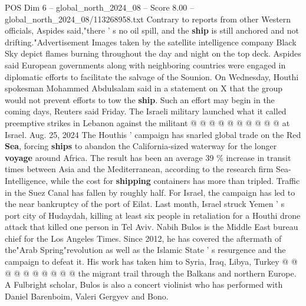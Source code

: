\begin{textsample}{POS Dim 6 – global\_north\_2024\_08 – Score 8.00 – global\_north\_2024\_08/113268958.txt}
Contrary to reports from other Western officials, Aspides said,"there ' s no oil spill, and the \textbf{ship} is still anchored and not drifting."Advertisement Images taken by the satellite intelligence company Black Sky depict flames burning throughout the day and night on the top deck.
Aspides said European governments along with neighboring countries were engaged in diplomatic efforts to facilitate the salvage of the Sounion.
On Wednesday, Houthi spokesman Mohammed Abdulsalam said in a statement on X that the group would not prevent efforts to tow the \textbf{ship}.
Such an effort may begin in the coming days, Reuters said Friday.
The Israeli military launched what it called preemptive strikes in Lebanon against the militant @ @ @ @ @ @ @ @ @ @ at Israel.
Aug. 25, 2024 The Houthis ' campaign has snarled global trade on the Red \textbf{Sea}, forcing \textbf{ships} to abandon the California-sized waterway for the longer \textbf{voyage} around Africa.
The result has been an average 39 \% increase in transit times between Asia and the Mediterranean, according to the research firm Sea-Intelligence, while the cost for \textbf{shipping} containers has more than tripled.
Traffic in the Suez Canal has fallen by roughly half.
For Israel, the campaign has led to the near bankruptcy of the port of Eilat.
Last month, Israel struck Yemen ' s port city of Hudaydah, killing at least six people in retaliation for a Houthi drone attack that killed one person in Tel Aviv.
Nabih Bulos is the Middle East bureau chief for the Los Angeles Times.
Since 2012, he has covered the aftermath of the"Arab Spring"revolution as well as the Islamic State ' s resurgence and the campaign to defeat it.
His work has taken him to Syria, Iraq, Libya, Turkey @ @ @ @ @ @ @ @ @ @ the migrant trail through the Balkans and northern Europe.
A Fulbright scholar, Bulos is also a concert violinist who has performed with Daniel Barenboim, Valeri Gergyev and Bono.

\end{textsample}
